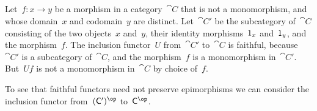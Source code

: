 \subsection{}

Let~$f \colon x \to y$ be a morphism in a category~$\cat{C}$ that is not a monomorphism, and whose domain~$x$ and codomain~$y$ are distinct.
Let~$\cat{C}'$ be the subcategory of~$\cat{C}$ consisting of the two objects~$x$ and~$y$, their identity morphisms~$1_x$ and~$1_y$, and the morphism~$f$.
The inclusion functor~$U$ from~$\cat{C}'$ to~$\cat{C}$ is faithful, because~$\cat{C}'$ is a subcategory of~$\cat{C}$, and the morphism~$f$ is a monomorphism in~$\cat{C}'$.
But~$U f$ is not a monomorphism in~$\cat{C}$ by choice of~$f$.

To see that faithful functors need not preserve epimorphisms we can consider the inclusion functor from~$(\cat{C}')^{\op}$ to~$\cat{C}^{\op}$.

